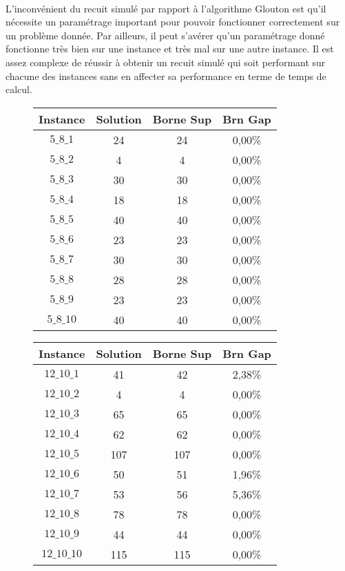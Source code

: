 \documentclass[a4paper, 11pt]{article} %
\begin{document}
\paragraph*{}
L'inconvénient du recuit simulé par rapport à l'algorithme Glouton est qu'il nécessite un paramétrage important pour pouvoir fonctionner correctement sur un problème donnée. Par ailleurs, il peut s'avérer qu'un paramétrage donné fonctionne très bien sur une instance et très mal sur une autre instance. Il est assez complexe de réussir à obtenir un recuit simulé qui soit performant sur chacune des instances sans en affecter sa performance en terme de temps de calcul.

\begin{center}
\begin{figure}[H]
   \begin{minipage}[c]{.46\linewidth}
      \begin{tabular}{|c|c|c|c|}
      \hline 
        Instance & Solution & Borne Sup & Brn Gap  \\ \hline
$5\_8\_1$ &  24 &  24 &  0,00\% \\ \hline
$5\_8\_2$ &  4 & 4 & 0,00\% \\ \hline
$5\_8\_3$ &  30 &  30 &  0,00\% \\ \hline
$5\_8\_4$ &  18 &  18 &  0,00\% \\ \hline
$5\_8\_5$ &  40 &  40 &  0,00\% \\ \hline
$5\_8\_6$ &  23 &  23 &  0,00\% \\ \hline
$5\_8\_7$ &  30 &  30 &  0,00\% \\ \hline
$5\_8\_8$ &  28 &  28 &  0,00\% \\ \hline
$5\_8\_9$ &  23 &  23 &  0,00\% \\ \hline
$5\_8\_10$ & 40 &  40 &  0,00\% \\ \hline
      \end{tabular}
   \end{minipage} \hfill
   \begin{minipage}[c]{.46\linewidth}
      \begin{tabular}{|c|c|c|c|}
      \hline 
        Instance & Solution & Borne Sup & Brn Gap  \\ \hline
$12\_10\_1$ &  41 &  42 &  2,38\% \\ \hline
$12\_10\_2$ &  4 & 4 & 0,00\% \\ \hline
$12\_10\_3$ &  65 &  65 &  0,00\% \\ \hline
$12\_10\_4$ &  62 &  62 &  0,00\% \\ \hline
$12\_10\_5$ &  107 & 107 & 0,00\% \\ \hline
$12\_10\_6$ &  50 &  51 &  1,96\% \\ \hline
$12\_10\_7$ &  53 &  56 &  5,36\% \\ \hline
$12\_10\_8$ &  78 &  78 &  0,00\% \\ \hline
$12\_10\_9$ &  44 &  44 &  0,00\% \\ \hline
$12\_10\_10$ & 115 & 115 & 0,00\% \\ \hline
      \end{tabular}
   \end{minipage}
\end{figure}


\end{center}
\end{document}
